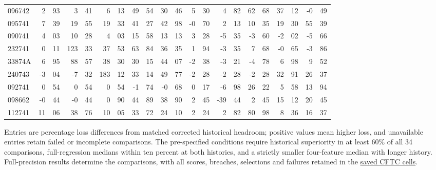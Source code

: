 \begin{table}[t]
{\begin{tabular}{l*{10}{r@{.}l}}
096742 & 2 & 93 & 3 & 41 & 6 & 13 & 49 & 54 & 30 & 46 & 5 & 30 & 4 & 82 & 62 & 68 & 37 & 12 & -0 & 49 \\
095741 & 7 & 39 & 19 & 55 & 19 & 33 & 41 & 27 & 42 & 98 & -0 & 70 & 2 & 13 & 10 & 35 & 19 & 30 & 55 & 39 \\
090741 & 4 & 03 & 10 & 28 & 4 & 03 & 15 & 58 & 13 & 13 & 3 & 28 & -5 & 35 & -3 & 60 & -2 & 02 & -5 & 66 \\
232741 & 0 & 11 & 123 & 33 & 37 & 53 & 63 & 84 & 36 & 35 & 1 & 94 & -3 & 35 & 7 & 68 & -0 & 65 & -3 & 86 \\
33874A & 6 & 95 & 88 & 57 & 38 & 30 & 30 & 15 & 44 & 07 & -2 & 38 & -3 & 21 & -4 & 78 & 6 & 98 & 9 & 52 \\
240743 & -3 & 04 & -7 & 32 & 183 & 12 & 33 & 14 & 49 & 77 & -2 & 28 & -2 & 28 & -2 & 28 & 32 & 91 & 26 & 37 \\
092741 & 0 & 54 & 0 & 54 & 0 & 54 & -1 & 74 & -0 & 68 & 0 & 17 & -6 & 98 & 26 & 22 & 5 & 58 & 13 & 94 \\
098662 & -0 & 44 & -0 & 44 & 0 & 90 & 44 & 89 & 38 & 90 & 2 & 45 & -39 & 44 & 2 & 45 & 15 & 12 & 20 & 45 \\
112741 & 11 & 06 & 38 & 76 & 10 & 05 & 33 & 72 & 24 & 10 & 2 & 24 & 2 & 82 & 80 & 98 & 8 & 36 & 16 & 37 \\
\bottomrule\end{tabular}}
\par\vspace{2pt}\begin{minipage}{.98\linewidth}\footnotesize
Entries are percentage loss differences from matched corrected historical headroom; positive values mean higher loss, and unavailable entries retain failed or incomplete comparisons.
The pre-specified conditions require historical superiority in at least 60\% of all 34 comparisons, full-regression medians within ten percent at both histories, and a strictly smaller four-feature median with longer history.
Full-precision results determine the comparisons, with all scores, breaches, selections and failures retained in the \href{https://github.com/ByronLi0207/financial-mathematics-paper-20261020/blob/submission-final/results/v10/cftc/cells.csv}{saved CFTC cells}.
\end{minipage}\end{table}
